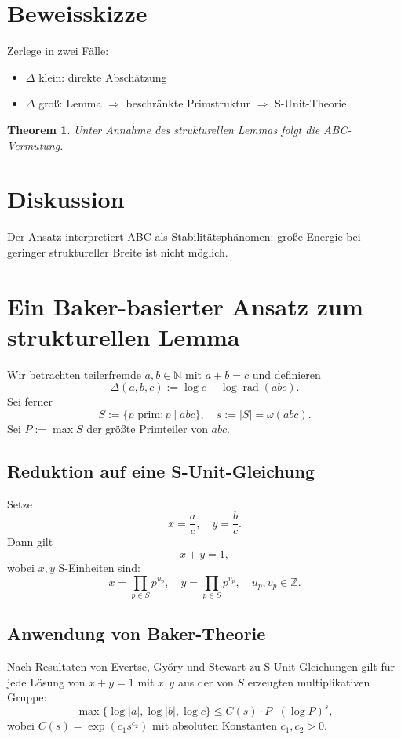 \documentclass{article}
\newtheorem{theorem}{Theorem}
\newcommand{\rad}{\operatorname{rad}}
\begin{document}
	\section{Beweisskizze}
	Zerlege in zwei Fälle:
	\begin{itemize}
		\item $\Delta$ klein: direkte Abschätzung
		\item $\Delta$ groß: Lemma $\Rightarrow$ beschränkte Primstruktur $\Rightarrow$ S-Unit-Theorie
	\end{itemize}
	
	\begin{theorem}
		Unter Annahme des strukturellen Lemmas folgt die ABC-Vermutung.
	\end{theorem}
	
	\section{Diskussion}
	Der Ansatz interpretiert ABC als Stabilitätsphänomen:
	große Energie bei geringer struktureller Breite ist nicht möglich.
	
	\section{Ein Baker-basierter Ansatz zum strukturellen Lemma}
	
	Wir betrachten teilerfremde $a,b \in \mathbb{N}$ mit $a+b=c$ und definieren
	\[
	\Delta(a,b,c) := \log c - \log \rad(abc).
	\]
	Sei ferner
	\[
	S := \{p \text{ prim} : p \mid abc\}, \quad s := |S| = \omega(abc).
	\]
	Sei $P := \max S$ der größte Primteiler von $abc$.
	
	\subsection{Reduktion auf eine S-Unit-Gleichung}
	
	Setze
	\[
	x = \frac{a}{c}, \quad y = \frac{b}{c}.
	\]
	Dann gilt
	\[
	x + y = 1,
	\]
	wobei $x,y$ S-Einheiten sind:
	\[
	x = \prod_{p \in S} p^{u_p}, \quad
	y = \prod_{p \in S} p^{v_p}, \quad u_p, v_p \in \mathbb{Z}.
	\]
	
	\subsection{Anwendung von Baker-Theorie}
	
	Nach Resultaten von Evertse, Győry und Stewart zu S-Unit-Gleichungen gilt für jede Lösung von $x + y = 1$ mit $x,y$ aus der von $S$ erzeugten multiplikativen Gruppe:
	\[
	\max\{ \log |a|, \log |b|, \log c \} \le C(s) \cdot P \cdot (\log P)^s,
	\]
	wobei $C(s) = \exp(c_1 s^{c_2})$ mit absoluten Konstanten $c_1, c_2 > 0$.
	
\end{document}
